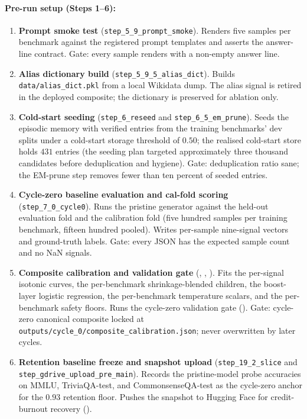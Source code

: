 \paragraph{Pre-run setup (Steps 1--6):}
\begin{enumerate}
\item \textbf{Prompt smoke test} (\verb|step_5_9_prompt_smoke|). Renders five samples per benchmark against the registered prompt templates and asserts the answer-line contract. Gate: every sample renders with a non-empty answer line.
\item \textbf{Alias dictionary build} (\verb|step_5_9_5_alias_dict|). Builds \verb|data/alias_dict.pkl| from a local Wikidata dump. The alias signal is retired in the deployed composite; the dictionary is preserved for ablation only.
\item \textbf{Cold-start seeding} (\verb|step_6_reseed| and \verb|step_6_5_em_prune|). Seeds the episodic memory with verified entries from the training benchmarks' dev splits under a cold-start storage threshold of $0.50$; the realised cold-start store holds $431$ entries (the seeding plan targeted approximately three thousand candidates before deduplication and hygiene). Gate: deduplication ratio sane; the EM-prune step removes fewer than ten percent of seeded entries.
\item \textbf{Cycle-zero baseline evaluation and cal-fold scoring} (\verb|step_7_0_cycle0|). Runs the pristine generator against the held-out evaluation fold and the calibration fold (five hundred samples per training benchmark, fifteen hundred pooled). Writes per-sample nine-signal vectors and ground-truth labels. Gate: every JSON has the expected sample count and no NaN signals.
\item \textbf{Composite calibration and validation gate} (, , ). Fits the per-signal isotonic curves, the per-benchmark shrinkage-blended children, the boost-layer logistic regression, the per-benchmark temperature scalars, and the per-benchmark safety floors. Runs the cycle-zero validation gate (). Gate: cycle-zero canonical composite locked at \verb|outputs/cycle_0/composite_calibration.json|; never overwritten by later cycles.
\item \textbf{Retention baseline freeze and snapshot upload} (\verb|step_19_2_slice| and \verb|step_gdrive_upload_pre_main|). Records the pristine-model probe accuracies on MMLU, TriviaQA-test, and CommonsenseQA-test as the cycle-zero anchor for the $0.93$ retention floor. Pushes the snapshot to Hugging Face for credit-burnout recovery ().
\end{enumerate}

